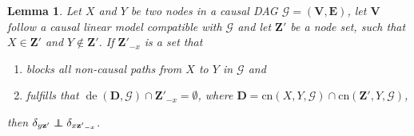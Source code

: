 \documentclass[11pt,a4paper]{article}
\newtheorem{Lemma}[Satz]{Lemma}
\theoremstyle{definition}
\theoremstyle{remark}
\newcommand\ci{\protect\mathpalette{\protect\independenT}{\perp}}
\def\independenT#1#2{\mathrel{\rlap{$#1#2$}\mkern2mu{#1#2}}}
\DeclareMathOperator{\de}{de}
\newcommand{\g}[1][G]{\mathcal{#1}}
\begin{document}
%	
%	 



\begin{Lemma}
	 Let $X$ and $Y$ be two nodes in a causal DAG $\g=(\mathbf{V},\mathbf{E})$, let $\mathbf{V}$ follow a causal linear model compatible with $\g$ and let $\mathbf{Z'}$ be a node set, such that $X \in \mathbf{Z'}$ and $Y\notin \mathbf{Z'}$. If $\mathbf{Z'}_{-x}$ is a set that
	 \begin{enumerate}
	 	\item blocks all non-causal paths from $X$ to $Y$ in $\g$ and 
	 	\item fulfills that $\de(\mathbf{D},\g) \cap \mathbf{Z'}_{-x} =\emptyset$, where $\mathbf{D}=\text{cn}(X,Y,\g) \cap \text{cn}(\mathbf{Z'},Y,\g)$,
	 \end{enumerate}
	 then $\delta_{y\mathbf{z'}} \ci \delta_{x\mathbf{z'}_{-x}}$.
	\label{ind-res}
\end{Lemma}
\end{document}
